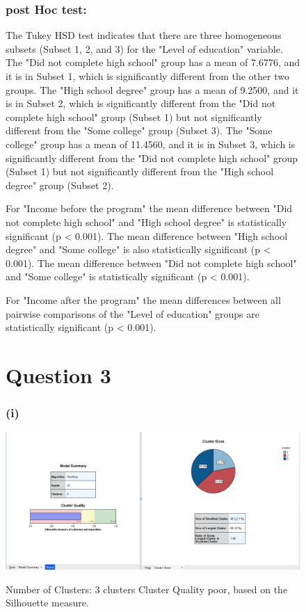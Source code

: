 \documentclass[english,10pt,a4paper]{article}
\begin{document}
\begin{figure}[h]
	\subsubsection*{post Hoc test:}
		The Tukey HSD test indicates that there are three homogeneous subsets (Subset 1, 2, and 3) for the "Level of education" variable.
	The "Did not complete high school" group has a mean of 7.6776, and it is in Subset 1, which is significantly different from the other two groups.
	The "High school degree" group has a mean of 9.2500, and it is in Subset 2, which is significantly different from the "Did not complete high school" group (Subset 1) but not significantly different from the "Some college" group (Subset 3).
	The "Some college" group has a mean of 11.4560, and it is in Subset 3, which is significantly different from the "Did not complete high school" group (Subset 1) but not significantly different from the "High school degree" group (Subset 2).
	
	
	For "Income before the program" the mean difference between "Did not complete high school" and "High school degree" is statistically significant (p < 0.001). The mean difference between "High school degree" and "Some college" is also statistically significant (p < 0.001). The mean difference between "Did not complete high school" and "Some college" is statistically significant (p < 0.001).
	
	For "Income after the program" the mean differences between all pairwise comparisons of the "Level of education" groups are statistically significant (p < 0.001).
	

	
	
		\end{figure}
		
	\begin{figure}[h]	
	\section*{Question 3 }
	\subsubsection*{(i)}
	
	\includegraphics[width=1.3\linewidth]{Clusters}
	
	Number of Clusters: 3 clusters \newline
	Cluster Quality poor, based on the Silhouette measure.
\end{figure}
\end{document}
